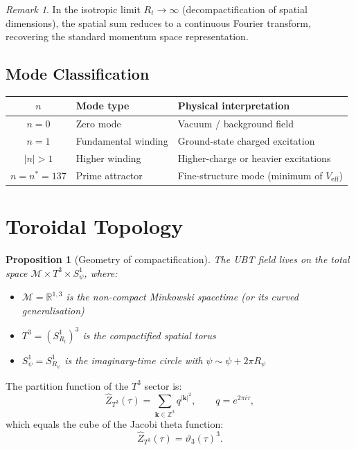 \documentclass[11pt,a4paper]{article}
\newtheorem{proposition}[theorem]{Proposition}
\theoremstyle{definition}
\theoremstyle{remark}
\newtheorem{remark}[theorem]{Remark}
\begin{document}
\begin{remark}
In the isotropic limit $R_t \to \infty$ (decompactification of spatial dimensions),
the spatial sum reduces to a continuous Fourier transform, recovering the
standard momentum space representation.
\end{remark}

\subsection{Mode Classification}

\begin{center}
\begin{tabular}{cll}
\toprule
$n$ & Mode type & Physical interpretation \\
\midrule
$n = 0$ & Zero mode & Vacuum / background field \\
$n = 1$ & Fundamental winding & Ground-state charged excitation \\
$|n| > 1$ & Higher winding & Higher-charge or heavier excitations \\
$n = n^* = 137$ & Prime attractor & Fine-structure mode (minimum of $V_{\mathrm{eff}}$) \\
\bottomrule
\end{tabular}
\end{center}

\section{Toroidal Topology}\label{sec:torus}

\begin{proposition}[Geometry of compactification]\label{prop:torus}
The UBT field lives on the total space
$\mathcal{M} \times T^3 \times S^1_\psi$, where:
\begin{itemize}
  \item $\mathcal{M} = \mathbb{R}^{1,3}$ is the non-compact Minkowski spacetime
    (or its curved generalisation)
  \item $T^3 = (S^1_{R_t})^3$ is the compactified spatial torus
  \item $S^1_\psi = S^1_{R_\psi}$ is the imaginary-time circle with $\psi \sim \psi + 2\pi R_\psi$
\end{itemize}
\end{proposition}

The partition function of the $T^3$ sector is:
\begin{equation}\label{eq:Z_T3}
  \hat{Z}_{T^3}(\tau)
  = \sum_{\mathbf{k}\in\mathbb{Z}^3} q^{|\mathbf{k}|^2},
  \qquad q = e^{2\pi i\tau},
\end{equation}
which equals the cube of the Jacobi theta function:
\begin{equation}\label{eq:Z_theta3}
  \hat{Z}_{T^3}(\tau) = \vartheta_3(\tau)^3.
\end{equation}
\end{document}

